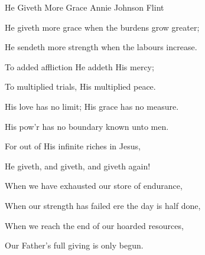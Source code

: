 \documentclass[12pt]{book}
\begin{document}
\begin{song}{He Giveth More Grace}{}
  {\SBPubDom}
  {Annie Johnson Flint}
  {}
  {}

  \begin{SBVerse}
    He giveth more grace when the burdens grow greater;

    He sendeth more strength when the labours increase.

    To added affliction He addeth His mercy;

    To multiplied trials, His multiplied peace.

    His love has no limit; His grace has no measure.

    His pow'r has no boundary known unto men.

    For out of His infinite riches in Jesus,

    He giveth, and giveth, and giveth again!
  \end{SBVerse}

  \begin{SBVerse}
    When we have exhausted our store of endurance,

    When our strength has failed ere the day is half done,

    When we reach the end of our hoarded resources,

    Our Father's full giving is only begun.
  \end{SBVerse}

\end{song}
\end{document}
